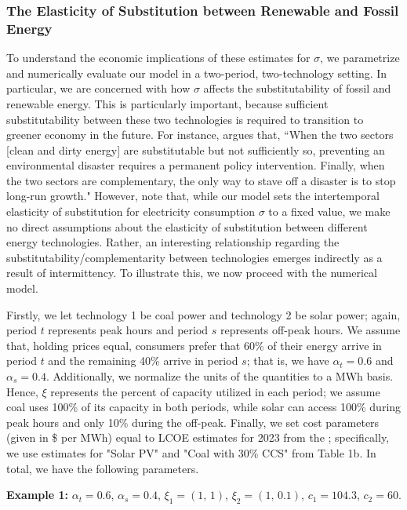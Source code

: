 \documentclass[11pt,a4paper]{extarticle}
\begin{document}
\subsubsection{The Elasticity of Substitution between Renewable and Fossil Energy}


To understand the economic implications of these estimates for $\sigma$, we parametrize and numerically evaluate our model in a two-period, two-technology setting. In particular, we are concerned with how $\sigma$ affects the substitutability of fossil and renewable energy. This is particularly important, because sufficient substitutability between these two technologies is required to transition to greener economy in the future. For instance, \citet{Ace2012} argues that, ``When the two
sectors [clean and dirty energy] are substitutable but not sufficiently so, preventing an environmental disaster requires a permanent policy intervention. Finally, when the two sectors are complementary, the only way to stave off a disaster is to stop long-run growth." However, note that, while our model sets the intertemporal elasticity of substitution for  electricity consumption $\sigma$ to a fixed value, we make no direct assumptions about the elasticity of substitution between different energy technologies. Rather, an interesting relationship regarding the substitutability/complementarity between technologies emerges indirectly as a result of intermittency. To illustrate this, we now proceed with the numerical model.

Firstly, we let technology 1 be coal power and technology 2 be solar power; again, period $t$ represents peak hours and period $s$ represents off-peak hours. We assume that, holding prices equal, consumers prefer that 60\% of their energy arrive in period $t$ and the remaining 40\% arrive in period $s$; that is, we have $\alpha_t = 0.6$ and $\alpha_s = 0.4$. Additionally, we normalize the units of the quantities to a MWh basis. Hence, $\xi$ represents the percent of capacity utilized in each period; we assume coal uses 100\% of its capacity in both periods, while solar can access 100\% during peak hours and only 10\% during the off-peak. Finally, we set cost parameters (given in  \$ per MWh)  equal to LCOE estimates for 2023 from the \citet{EIALCOE}; specifically, we use estimates for "Solar PV" and "Coal with 30\% CCS" from Table 1b. In total, we have the following parameters. 

\begin{center}
	\noindent \textbf{Example  1:} $\alpha_t = 0.6$, $\alpha_s = 0.4$, $\xi_1 = (1, \, 1)$, $\xi_2 = (1, \, 0.1)$, $c_1 = 104.3$, $c_2 = 60$. 
	\label{Params: Example 1}
\end{center}
\end{document}
